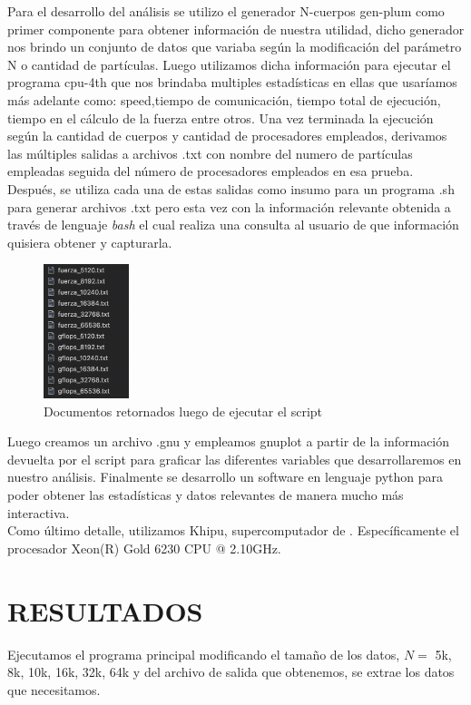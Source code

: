 \documentclass[conference]{IEEEtran}
\begin{document}
\newpage 
Para el desarrollo del análisis se utilizo el generador N-cuerpos gen-plum como primer componente para obtener información de nuestra utilidad, dicho generador nos brindo un conjunto de datos que variaba según la modificación del parámetro N o cantidad de partículas. Luego utilizamos dicha información para ejecutar el programa cpu-4th que nos brindaba multiples estadísticas en ellas que usaríamos más adelante como: speed,tiempo de comunicación, tiempo total de ejecución, tiempo en el cálculo de la fuerza entre otros.
Una vez terminada la ejecución según la cantidad de cuerpos y cantidad de procesadores empleados, derivamos las múltiples salidas a archivos .txt con nombre del numero de partículas empleadas seguida del número de procesadores empleados en esa prueba. Después, se utiliza cada una de estas salidas como insumo para un programa .sh para generar archivos .txt pero esta vez con la información relevante obtenida a través de lenguaje \textit{bash} el cual realiza una consulta al usuario de que información quisiera obtener y capturarla. \\

\begin{figure}[!ht]
    \centering
    \includegraphics[width =2.5cm]{Images/script.png}
    \caption{Documentos retornados luego de ejecutar el script}
    \label{fig:my_label}
\end{figure}

Luego creamos un archivo .gnu y empleamos gnuplot a partir de la información devuelta por el script para graficar las diferentes variables que desarrollaremos en nuestro análisis. Finalmente se desarrollo un software en lenguaje python para poder obtener las estadísticas y datos relevantes de manera mucho más interactiva. \\

Como último detalle, utilizamos Khipu, supercomputador de \href{https://web.khipu.utec.edu.pe}{}. Específicamente el procesador \href{https://web.khipu.utec.edu.pe/}{} Xeon(R) Gold 6230 CPU @ 2.10GHz.


\section{RESULTADOS}
Ejecutamos el programa principal modificando el tamaño de los datos, $N = $ {5k, 8k, 10k, 16k, 32k, 64k} y del archivo de salida que obtenemos, se extrae los datos que necesitamos.
\end{document}

